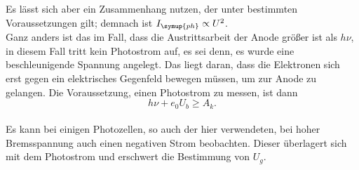     \noindent Es lässt sich aber ein Zusammenhang nutzen, der unter bestimmten Voraussetzungen gilt;
    demnach ist $I_{\symup{ph}} \propto U^2$. \\
    Ganz anders ist das im Fall, dass die Austrittsarbeit der Anode größer ist als $h \nu$, in diesem Fall tritt kein Photostrom auf, es 
    sei denn, es wurde eine beschleunigende Spannung angelegt. Das liegt daran, dass die Elektronen sich erst gegen ein elektrisches 
    Gegenfeld bewegen müssen, um zur Anode zu gelangen. Die Voraussetzung, einen Photostrom zu messen, ist dann
    \begin{equation*}
        h \nu + e_0 U_b \geq A_k .
    \end{equation*}
    \\
    \noindent Es kann bei einigen Photozellen, so auch der hier verwendeten, bei hoher Bremsspannung auch einen negativen Strom beobachten. Dieser 
    überlagert sich mit dem Photostrom und erschwert die Bestimmung von $U_g$.
